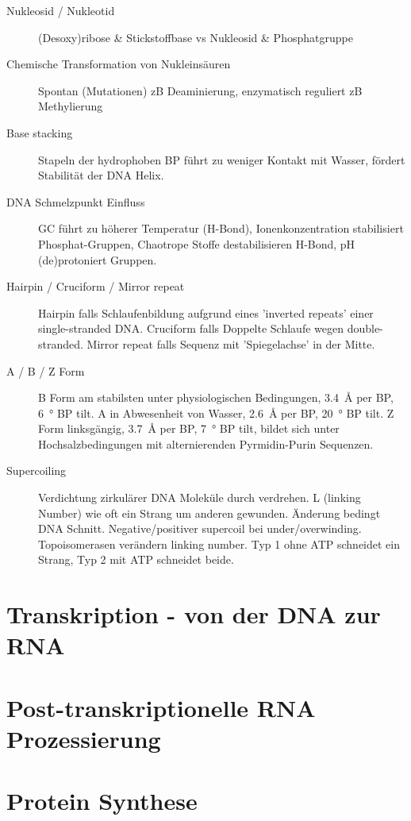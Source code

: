 \documentclass[a4paper,twocolumn,usegeometry,english,fontsize=6,DIV=16]{scrartcl}
\begin{document}
\begin{description}
	\item[Nukleosid / Nukleotid] (Desoxy)ribose \& Stickstoffbase vs
		Nukleosid \& Phosphatgruppe
	\item[Chemische Transformation von Nukleinsäuren] Spontan (Mutationen)
		zB Deaminierung, enzymatisch reguliert zB Methylierung
	\item[Base stacking] Stapeln der hydrophoben BP führt zu weniger
		Kontakt mit Wasser, fördert Stabilität der DNA Helix.
	\item[DNA Schmelzpunkt Einfluss] GC führt zu höherer Temperatur
		(H-Bond), Ionenkonzentration stabilisiert Phosphat-Gruppen,
		Chaotrope Stoffe destabilisieren H-Bond, pH (de)protoniert
		Gruppen.
	\item[Hairpin / Cruciform / Mirror repeat] Hairpin falls
		Schlaufenbildung aufgrund eines 'inverted repeats' einer
		single-stranded DNA. Cruciform falls Doppelte Schlaufe wegen
		double-stranded. Mirror repeat falls Sequenz mit 'Spiegelachse'
		in der Mitte.
	\item[A / B / Z Form] B Form am stabilsten unter physiologischen
		Bedingungen, \SI{3.4}{\angstrom} per BP, \SI{6}{\degree} BP
		tilt. A in Abwesenheit von Wasser, \SI{2.6}{\angstrom} per BP,
		\SI{20}{\degree} BP tilt. Z Form linksgängig,
		\SI{3.7}{\angstrom} per BP, \SI{7}{\degree} BP tilt, bildet
		sich unter Hochsalzbedingungen mit alternierenden
		Pyrmidin-Purin Sequenzen.
	\item[Supercoiling] Verdichtung zirkulärer DNA Moleküle durch
		verdrehen. L (linking Number) wie oft ein Strang um anderen
		gewunden. Änderung bedingt DNA Schnitt. Negative/positiver
		supercoil bei under/overwinding. Topoisomerasen verändern
		linking number. Typ 1 ohne ATP schneidet ein Strang, Typ 2 mit
		ATP schneidet beide.
\end{description}

\section{Transkription - von der DNA zur RNA}

\section{Post-transkriptionelle RNA Prozessierung}

\section{Protein Synthese}
 
\end{document}
